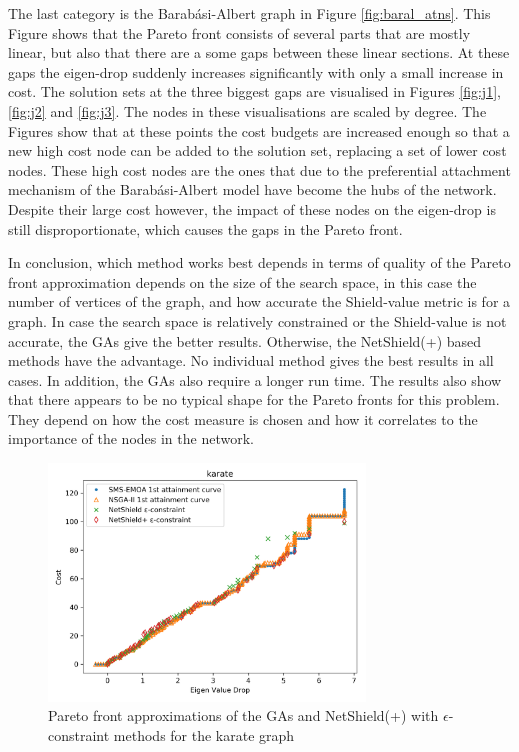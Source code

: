 \documentclass[11pt]{article}
\theoremstyle{definition}
\begin{document}
The last category is the Barab\'asi-Albert graph in Figure \ref{fig:baral_atns}. This Figure shows that the Pareto front consists of several parts that are mostly linear, but also that there are a some gaps between these linear sections.  At these gaps the eigen-drop suddenly increases significantly with only a small increase in cost. The solution sets at the three biggest gaps are visualised in Figures \ref{fig:j1}, \ref{fig:j2} and \ref{fig:j3}.  The nodes in these visualisations are scaled by degree. The Figures show that at these points the cost budgets are increased enough so that a new high cost node can be added to the solution set, replacing a set of lower cost nodes. These high cost nodes are the ones that due to the preferential attachment mechanism of the Barab\'asi-Albert model have become the hubs of the network. Despite their large cost however, the impact of these nodes on the eigen-drop is still disproportionate, which causes the gaps in the Pareto front. 

In conclusion, which method works best depends in terms of quality of the Pareto front approximation depends on the size of the search space, in this case the number of vertices of the graph, and how accurate the Shield-value metric is for a graph. In case the search space is relatively constrained or the Shield-value is not accurate, the GAs give the better results. Otherwise, the NetShield(+) based methods have the advantage. No individual method gives the best results in all cases. In addition, the GAs also require a longer run time. The results also show that there appears to be no typical shape for the Pareto fronts for this problem. They depend on how the cost measure is chosen and how it correlates to the importance of the nodes in the network.


\begin{figure}[h!]
  \centering
    \includegraphics[width=0.75\textwidth]{results_ns_ga/karate_attaintment_netshield}
  \caption{Pareto front approximations of the GAs and NetShield(+) with $\epsilon$-constraint methods for the karate graph}
  \label{fig:karate_atns}
\end{figure}
\end{document}
